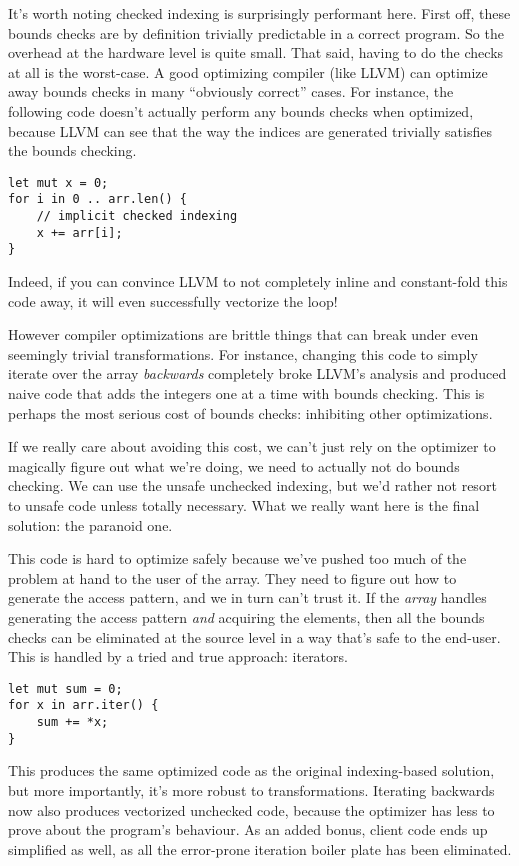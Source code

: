 It's worth noting checked indexing is surprisingly performant here.
First off, these bounds checks are by definition trivially predictable in a
correct program. So the overhead at the hardware level is quite small. That said,
having to do the checks at all is the worst-case. A good optimizing compiler
(like LLVM) can optimize away bounds checks in many ``obviously correct'' cases.
For instance, the following code doesn't actually perform any bounds checks
when optimized, because LLVM can see that the way the indices are generated
trivially satisfies the bounds checking.

\begin{verbatim}
let mut x = 0;
for i in 0 .. arr.len() {
    // implicit checked indexing
    x += arr[i];
}
\end{verbatim}

Indeed, if you can convince LLVM to not completely inline and constant-fold
this code away, it will even successfully vectorize the loop!

However compiler optimizations are brittle things that can break under even
seemingly trivial transformations. For instance, changing this code to simply
iterate over the array \emph{backwards} completely broke LLVM's analysis and produced
naive code that adds the integers one at a time with bounds checking. This is
perhaps the most serious cost of bounds checks: inhibiting other optimizations.

If we really care about avoiding this cost, we can't just rely on the optimizer
to magically figure out what we're doing, we need to actually not do bounds
checking. We can use the unsafe unchecked indexing, but we'd rather not resort
to unsafe code unless totally necessary. What we really want here is the final
solution: the paranoid one.

This code is hard to optimize safely
because we've pushed too much of the problem at hand to the user of the array.
They need to figure out how to generate the access pattern, and we in turn can't
trust it. If the \emph{array} handles generating the access pattern \emph{and}
acquiring the elements, then all the bounds checks can be eliminated at the
source level in a way that's safe to the end-user. This is handled by a tried
and true approach: iterators.

\begin{verbatim}
let mut sum = 0;
for x in arr.iter() {
    sum += *x;
}
\end{verbatim}

This produces the same optimized code as the original indexing-based solution,
but more importantly, it's more robust to transformations. Iterating
backwards now also produces vectorized unchecked code, because the optimizer
has less to prove about the program's behaviour. As an added bonus, client code
ends up simplified as well, as all the error-prone iteration boiler plate has
been eliminated.

